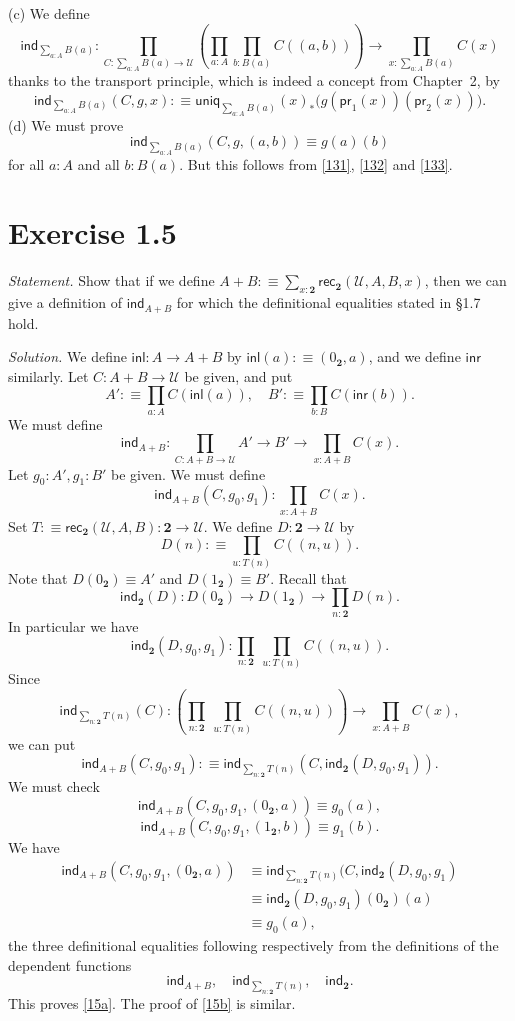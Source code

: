 \documentclass[12pt]{article}
\newcommand{\ind}{\mathsf{ind}}
\newcommand{\inl}{\mathsf{inl}}
\newcommand{\inr}{\mathsf{inr}}
\newcommand{\nn}{\noindent}
\newcommand{\pr}{\mathsf{pr}}
\newcommand{\rec}{\mathsf{rec}}
\newcommand{\two}{\mathbf2}
\newcommand{\U}{\mathcal U}
\newcommand{\uniq}{\mathsf{uniq}}
\begin{document}
\nn(c) We define
$$
\ind_{\sum_{a:A}B(a)} : \prod_{C:\sum_{a:A}B(a)\to\U} 
\left(\prod_{a:A}\prod_{b:B(a)} C((a,b))\right) 
\to \prod_{x:\sum_{a:A}B(a)} C(x)
$$
thanks to the transport principle, which is indeed a concept from Chapter~2, by
\begin{equation}\label{133}
\ind_{\sum_{a:A}B(a)}(C,g,x):
\equiv\uniq_{\sum_{a:A}B(a)}(x)_*\Big(g(\pr_1(x))(\pr_2(x))\Big).
\end{equation}
(d) We must prove 
$$
\ind_{\sum_{a:A}B(a)}(C,g,(a,b))\equiv g(a)(b)
$$
for all $a:A$ and all $b:B(a)$. But this follows from \eqref{131}, \eqref{132} and \eqref{133}.


\section{Exercise 1.5}

\emph{Statement.} Show that if we define $A+B:\equiv\sum_{x:\two}\rec_\two(\U,A,B,x)$, then we can give a definition of $\ind_{A+B}$ for which the definitional equalities stated in \S1.7 hold.

\nn\emph{Solution.} We define $\inl:A\to A+B$ by $\inl(a):\equiv(0_\two,a)$, and we define $\inr$ similarly. Let $C:A+B\to\U$ be given, and put 
$$
A':\equiv\prod_{a:A}C(\inl(a)),\quad B':\equiv\prod_{b:B}C(\inr(b)).
$$
We must define 
$$
\ind_{A+B}:\prod_{C:A+B\to\U}A'\to B'\to\prod_{x:A+B}C(x).
$$ 
Let $g_0:A',g_1:B'$ be given. We must define 
$$
\ind_{A+B}(C,g_0,g_1):\prod_{x:A+B}C(x).
$$ 
Set $T:\equiv\rec_\two(\U,A,B):\two\to\U$. We define $D:\two\to\U$ by 
$$
D(n):\equiv\prod_{u:T(n)}C((n,u)).
$$ 
Note that $D(0_\two)\equiv A'$ and $D(1_\two)\equiv B'$. Recall that 
$$
\ind_\two(D):D(0_\two)\to D(1_\two)\to\prod_{n:\two}D(n).
$$ 
In particular we have 
$$
\ind_\two(D,g_0,g_1):\prod_{n:\two}\ \prod_{u:T(n)}C((n,u)).
$$ 
Since 
$$
\ind_{\sum_{n:\two}T(n)}(C):\left(\prod_{n:\two}\ \prod_{u:T(n)}C((n,u))\right)\to\prod_{x:A+B}C(x),
$$ 
we can put 
$$
\ind_{A+B}(C,g_0,g_1):\equiv\ind_{\sum_{n:\two}T(n)}(C,\ind_\two(D,g_0,g_1)).
$$ 
We must check 
\begin{equation}\label{15a}
\ind_{A+B}(C,g_0,g_1,(0_\two,a))\equiv g_0(a),
\end{equation}
\begin{equation}\label{15b}
\ind_{A+B}(C,g_0,g_1,(1_\two,b))\equiv g_1(b).
\end{equation} 
We have 
\begin{align*}
\ind_{A+B}(C,g_0,g_1,(0_\two,a))&\equiv\ind_{\sum_{n:\two}T(n)}(C,\ind_\two(D,g_0,g_1)\\ 
&\equiv\ind_\two(D,g_0,g_1)(0_\two)(a)\\ 
&\equiv g_0(a),
\end{align*}
the three definitional equalities following respectively from the definitions of the dependent functions
$$
\ind_{A+B},\quad\ind_{\sum_{n:\two}T(n)},\quad\ind_\two.
$$ 
This proves \eqref{15a}. The proof of \eqref{15b} is similar.
\end{document}
